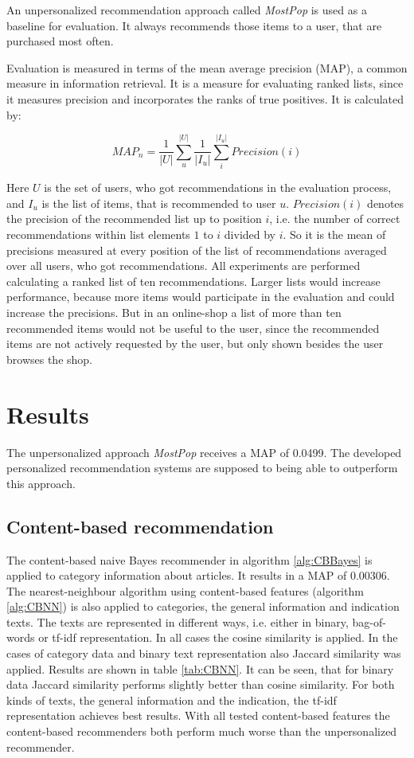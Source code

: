 \documentclass[10pt]{reportMaster}
\begin{document}
An unpersonalized recommendation approach called \textit{MostPop} is used as a baseline for evaluation.
It always recommends those items to a user, that are purchased most often.

Evaluation is measured in terms of the mean average precision (MAP), a common measure in information retrieval.
It is a measure for evaluating ranked lists, since it measures precision and incorporates the ranks of true positives.
It is calculated by:

\begin{equation}
	MAP_n = \frac{1}{|U|} \sum_u^{|U|} \frac{1}{|I_u|}\sum_i^{|I_u|} Precision(i)
\end{equation}

Here $U$ is the set of users, who got recommendations in the evaluation process, and $I_u$ is the list of items, that is recommended to user $u$.
$Precision(i)$ denotes the precision of the recommended list up to position $i$, i.e. the number of correct recommendations within list elements $1$ to $i$ divided by $i$.
So it is the mean of precisions measured at every position of the list of recommendations averaged over all users, who got recommendations.
All experiments are performed calculating a ranked list of ten recommendations.
Larger lists would increase performance, because more items would participate in the evaluation and could increase the precisions.
But in an online-shop a list of more than ten recommended items would not be useful to the user, since the recommended items are not actively requested by the user, but only shown besides the user browses the shop. 


\section{Results}
\label{sec:results}
The unpersonalized approach \textit{MostPop} receives a MAP of 0.0499.
The developed personalized recommendation systems are supposed to being able to outperform this approach.

\subsection*{Content-based recommendation}
The content-based naive Bayes recommender in algorithm \ref{alg:CBBayes} is applied to category information about articles.
It results in a MAP of 0.00306.
The nearest-neighbour algorithm using content-based features (algorithm \ref{alg:CBNN}) is also applied to categories, the general information and indication texts.
The texts are represented in different ways, i.e. either in binary, bag-of-words or tf-idf representation.
In all cases the cosine similarity is applied.
In the cases of category data and binary text representation also Jaccard similarity was applied. 
Results are shown in table \ref{tab:CBNN}.
It can be seen, that for binary data Jaccard similarity performs slightly better than cosine similarity.
For both kinds of texts, the general information and the indication, the tf-idf representation achieves best results.
With all tested content-based features the content-based recommenders both perform much worse than the unpersonalized recommender.
\end{document}
